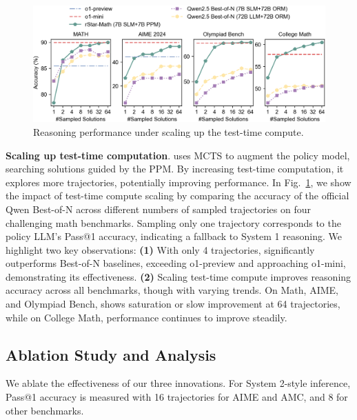 \begin{figure}[ht]
	\centering
	\includegraphics[width=1\textwidth]{scalinglaws.png}
	\vspace{-3ex}
	\caption{Reasoning performance under scaling up the test-time compute. }
	\label{fig:scalinglaws}
\end{figure}


\noindent\textbf{Scaling up test-time computation}. {\sysname} uses MCTS to augment the policy model, searching solutions guided by the PPM.  By increasing test-time computation, it explores more trajectories, potentially improving performance.
 In Fig.~\ref{fig:scalinglaws}, we show the impact of test-time compute scaling by comparing the accuracy of the official Qwen Best-of-N across different numbers of sampled trajectories on four challenging math benchmarks. Sampling only one trajectory corresponds to the policy LLM's Pass@1 accuracy,  indicating a fallback to System 1 reasoning.  We highlight two key observations: \textbf{(1)} With only 4 trajectories, {\sysname} significantly outperforms Best-of-N baselines, exceeding o1-preview and approaching o1-mini, demonstrating its effectiveness. \textbf{(2)} Scaling test-time compute improves reasoning accuracy across all benchmarks, though with varying trends. On Math, AIME, and Olympiad Bench, {\sysname} shows saturation or slow improvement at 64 trajectories, while on College Math, performance continues to improve steadily.
\subsection{Ablation Study and Analysis}
We ablate the effectiveness of our three innovations. For System 2-style inference, Pass@1 accuracy is measured with 16 trajectories for AIME and AMC, and 8 for other benchmarks.
 
